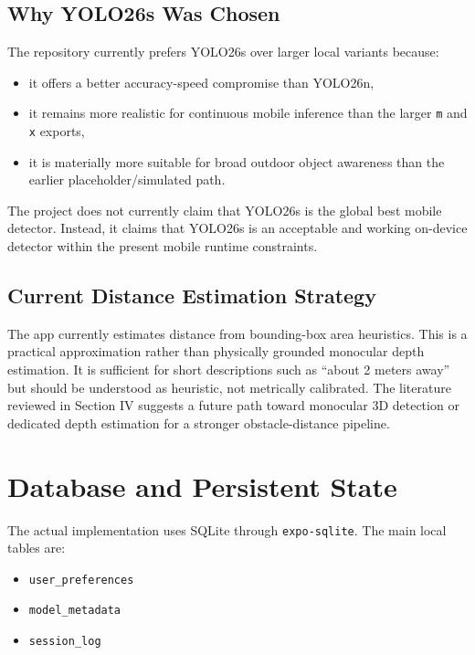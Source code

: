 \documentclass[conference]{IEEEtran}
\newcommand{\codeid}[1]{\begingroup\urlstyle{tt}\nolinkurl{#1}\endgroup}
\begin{document}
\subsection{Why YOLO26s Was Chosen}
The repository currently prefers YOLO26s over larger local variants because:
\begin{itemize}[leftmargin=1.2em]
\item it offers a better accuracy-speed compromise than YOLO26n,
\item it remains more realistic for continuous mobile inference than the larger \texttt{m} and \texttt{x} exports,
\item it is materially more suitable for broad outdoor object awareness than the earlier placeholder/simulated path.
\end{itemize}

The project does not currently claim that YOLO26s is the global best mobile detector. Instead, it claims that YOLO26s is an acceptable and working on-device detector within the present mobile runtime constraints.

\subsection{Current Distance Estimation Strategy}
The app currently estimates distance from bounding-box area heuristics. This is a practical approximation rather than physically grounded monocular depth estimation. It is sufficient for short descriptions such as ``about 2 meters away'' but should be understood as heuristic, not metrically calibrated. The literature reviewed in Section IV suggests a future path toward monocular 3D detection or dedicated depth estimation for a stronger obstacle-distance pipeline.

\section{Database and Persistent State}
The actual implementation uses SQLite through \codeid{expo-sqlite}. The main local tables are:
\begin{itemize}[leftmargin=1.2em]
\item \codeid{user_preferences}
\item \codeid{model_metadata}
\item \codeid{session_log}
\end{itemize}
\end{document}
